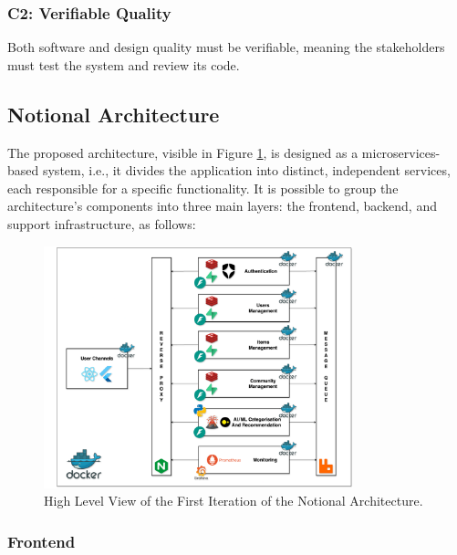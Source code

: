 \subsubsection{C2: Verifiable Quality}

Both software and design quality must be verifiable, meaning the stakeholders must test the system and review its code.


\subsection{Notional Architecture} \label{section:notional_architecture}

The proposed architecture, visible in Figure \ref{fig:notional_arch}, is designed as a microservices-based system, i.e., it divides the application into distinct, independent services, each responsible for a specific functionality. It is possible to group the architecture's components into three main layers: the frontend, backend, and support infrastructure, as follows:

\begin{figure}[!htb]
    \includegraphics[width=0.8\textwidth]{figs/chapter3/notional_arch.png}
    \centering
    \caption[Notional Architecture]{High Level View of the First Iteration of the Notional Architecture.}
    \label{fig:notional_arch}
\end{figure}

\subsubsection{Frontend}

